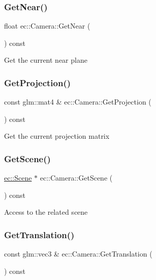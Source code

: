 \subsubsection{\texorpdfstring{Get\+Near()}{GetNear()}}
{\footnotesize\ttfamily float ec\+::\+Camera\+::\+Get\+Near (\begin{DoxyParamCaption}{ }\end{DoxyParamCaption}) const}

Get the current near plane \mbox{\label{classec_1_1_camera_a9c52ad9d4077faf50d1d7170d08e1f13}} 
\subsubsection{\texorpdfstring{Get\+Projection()}{GetProjection()}}
{\footnotesize\ttfamily const glm\+::mat4 \& ec\+::\+Camera\+::\+Get\+Projection (\begin{DoxyParamCaption}{ }\end{DoxyParamCaption}) const}

Get the current projection matrix \mbox{\label{classec_1_1_camera_a77f8c613ff916b697bdab94d4a610e5d}} 
\subsubsection{\texorpdfstring{Get\+Scene()}{GetScene()}}
{\footnotesize\ttfamily \mbox{\hyperlink{classec_1_1_scene}{ec\+::\+Scene}} $\ast$ ec\+::\+Camera\+::\+Get\+Scene (\begin{DoxyParamCaption}{ }\end{DoxyParamCaption}) const}

Access to the related scene \mbox{\label{classec_1_1_camera_a0f77ddae83a5b37600aa2863f235115b}} 
\subsubsection{\texorpdfstring{Get\+Translation()}{GetTranslation()}}
{\footnotesize\ttfamily const glm\+::vec3 \& ec\+::\+Camera\+::\+Get\+Translation (\begin{DoxyParamCaption}{ }\end{DoxyParamCaption}) const}

